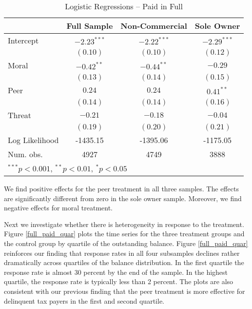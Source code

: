 \documentclass[12pt,titlepage]{article}
\begin{document}
\begin{table}[htbp]
\caption{Logistic Regressions -- Paid in Full}\label{VV}
\begin{center}
\begin{tabular}{l c c c }
\hline
               & Full Sample & Non-Commercial & Sole Owner \\
\hline
Intercept      & $-2.23^{***}$ & $-2.22^{***}$ & $-2.29^{***}$ \\
               & $(0.10)$      & $(0.10)$      & $(0.12)$      \\
Moral          & $-0.42^{**}$  & $-0.44^{**}$  & $-0.29$       \\
               & $(0.13)$      & $(0.14)$      & $(0.15)$      \\
Peer           & $0.24$        & $0.24$        & $0.41^{**}$   \\
               & $(0.14)$      & $(0.14)$      & $(0.16)$      \\
Threat         & $-0.21$       & $-0.18$       & $-0.04$       \\
               & $(0.19)$      & $(0.20)$      & $(0.21)$      \\
\hline
Log Likelihood & -1435.15      & -1395.06      & -1175.05      \\
Num. obs.      & 4927          & 4749          & 3888          \\
\hline
\multicolumn{4}{l}{\scriptsize{$^{***}p<0.001$, $^{**}p<0.01$, $^*p<0.05$}}
\end{tabular}
\end{center}
\end{table}
We find positive effects for the peer treatment in all three samples. The
effects are significantly different from zero in the sole owner sample. Moreover,
we find negative effects for moral treatment.

Next we investigate whether there is heterogeneity in response to the
treatment.  Figure \ref{full_paid_quar} plots the time series for the
three treatment groups and the control group by quartile of the
outstanding balance.  Figure \ref{full_paid_quar} reinforces our
finding that response rates in all four subsamples declines rather
dramatically across quartiles of the balance distribution. In the
first quartile the response rate is almost 30 percent by the end of
the sample. In the highest quartile, the response rate is typically
less than 2 percent.  The plots are also consistent with our previous
finding that the peer treatment is more effective for delinquent tax
payers in the first and second quartile.
\end{document}
